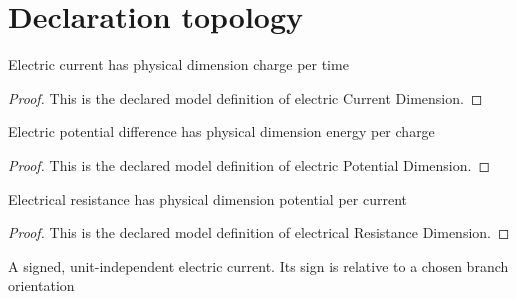 \section{Declaration topology}
\begin{definition}
  \label{def:physics:phyx-mini-0629:phyxminiproblems-problemphyxmini0629-electriccurrentdimension}
  Electric current has physical dimension charge per time
\end{definition}
\begin{proof}
  This is the declared model definition of electric Current Dimension.
\end{proof}
\begin{definition}
  \label{def:physics:phyx-mini-0629:phyxminiproblems-problemphyxmini0629-electricpotentialdimension}
  Electric potential difference has physical dimension energy per charge
\end{definition}
\begin{proof}
  This is the declared model definition of electric Potential Dimension.
\end{proof}
\begin{definition}
  \label{def:physics:phyx-mini-0629:phyxminiproblems-problemphyxmini0629-electricalresistancedimension}
  Electrical resistance has physical dimension potential per current
\end{definition}
\begin{proof}
  This is the declared model definition of electrical Resistance Dimension.
\end{proof}
\begin{definition}
  \label{def:physics:phyx-mini-0629:phyxminiproblems-problemphyxmini0629-electriccurrentquantity}
  A signed, unit-independent electric current. Its sign is relative to a chosen branch orientation
\end{definition}
